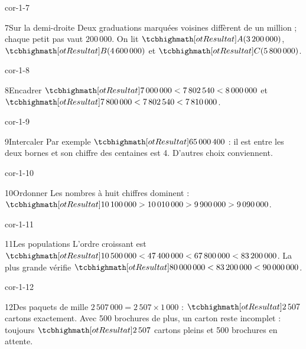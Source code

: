 \begin{blocLivre}{cor-1-7}\begin{corrige}{7}{Sur la demi-droite}
Deux graduations marquées voisines diffèrent de un million ; chaque petit pas vaut $200\,000$. On lit $\res{A(3\,200\,000)}$, $\res{B(4\,600\,000)}$ et $\res{C(5\,800\,000)}$.
\label{fig-cor-1-7}
\end{corrige}\end{blocLivre}
\begin{blocLivre}{cor-1-8}\begin{corrige}{8}{Encadrer}
$\res{7\,000\,000<7\,802\,540<8\,000\,000}$ et $\res{7\,800\,000<7\,802\,540<7\,810\,000}$.
\end{corrige}\end{blocLivre}
\begin{blocLivre}{cor-1-9}\begin{corrige}{9}{Intercaler}
Par exemple $\res{65\,000\,400}$ : il est entre les deux bornes et son chiffre des centaines est 4. D’autres choix conviennent.
\end{corrige}\end{blocLivre}
\begin{blocLivre}{cor-1-10}\begin{corrige}{10}{Ordonner}
Les nombres à huit chiffres dominent : $\res{10\,100\,000>10\,010\,000>9\,900\,000>9\,090\,000}$.
\end{corrige}\end{blocLivre}
\begin{blocLivre}{cor-1-11}\begin{corrige}{11}{Les populations}
L’ordre croissant est $\res{10\,500\,000<47\,400\,000<67\,800\,000<83\,200\,000}$. La plus grande vérifie $\res{80\,000\,000<83\,200\,000<90\,000\,000}$.
\end{corrige}\end{blocLivre}
\begin{blocLivre}{cor-1-12}\begin{corrige}{12}{Des paquets de mille}
$2\,507\,000=2\,507\times1\,000$ : $\res{2\,507}$ cartons exactement. Avec 500 brochures de plus, un carton reste incomplet : toujours $\res{2\,507}$ cartons pleins et 500 brochures en attente.
\end{corrige}\end{blocLivre}
